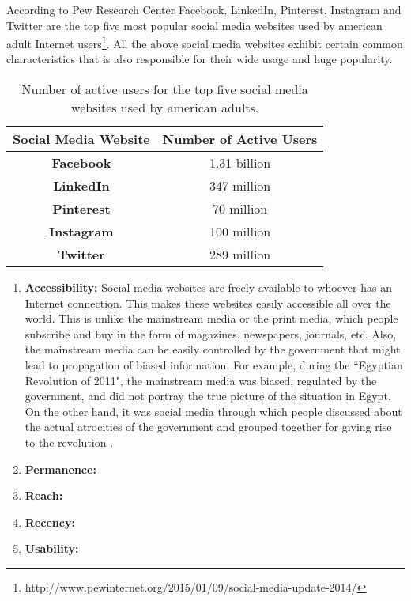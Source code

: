 According to Pew Research Center Facebook, LinkedIn, Pinterest, Instagram and Twitter are the top five most popular social media websites used by american adult Internet users\footnote{http://www.pewinternet.org/2015/01/09/social-media-update-2014/}. All the above social media websites exhibit certain common characteristics that is also responsible for their wide usage and huge popularity.

\begin{table}[h]
\centering
\caption{Number of active users for the top five social media websites used by american adults.}
\label{socialmediastat}
\begin{tabular}{|c|c|}
\hline
\textbf{Social Media Website} & \textbf{Number of Active Users} \\ \hline
\textbf{Facebook} & 1.31 billion \\ \hline
\textbf{LinkedIn} &  347 million \\ \hline
\textbf{Pinterest} & 70 million \\ \hline
\textbf{Instagram} & 100 million \\ \hline
\textbf{Twitter} & 289 million \\ \hline
\end{tabular}
\end{table}

\begin{enumerate}
\item \textbf{Accessibility:} Social media websites are freely available to whoever has an Internet connection. This makes these websites easily accessible all over the world. This is unlike the mainstream media or the print media, which people subscribe and buy in the form of magazines, newspapers, journals, etc. Also, the mainstream media can be easily controlled by the government that might lead to propagation of biased information. For example, during the ``Egyptian Revolution of 2011", the mainstream media was biased, regulated by the government, and did not portray the true picture of the situation in Egypt. On the other hand, it was social media through which people discussed about the actual atrocities of the government and grouped together for giving rise to the revolution \cite{hamdy2012framing}. 

\item \textbf{Permanence:}

\item \textbf{Reach:}


\item \textbf{Recency:}

\item \textbf{Usability:}
\end{enumerate}

